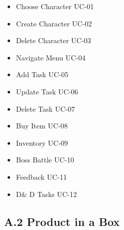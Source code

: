 \documentclass[12pt]{report}
\renewcommand{\_}{\kern-1.5pt\textunderscore\kern-1.5pt}
\begin{document}
\vspace{\baselineskip}
\begin{itemize}
	\item Choose Character UC-01\par

	\item Create Character UC-02\par

	\item Delete Character UC-03\par

	\item Navigate Menu UC-04\par

	\item Add Task UC-05\par

	\item Update Task UC-06\par

	\item Delete Task UC-07\par

	\item Buy Item UC-08\par

	\item Inventory UC-09\par

	\item Boss Battle UC-10\par

	\item Feedback UC-11\par

	\item D$\&$ D Tasks UC-12
\end{itemize}\par

\newpage
\vspace{\baselineskip}
\subsection*{A.2 Product in a Box}

\vspace{\baselineskip}


\end{document}
